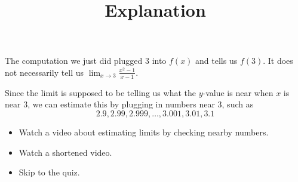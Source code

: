 \documentclass{ximera}
\title{Explanation}
\begin{document}
\begin{abstract}
\end{abstract}

\maketitle

The computation we just did plugged 3 into $f(x)$ and tells us $f(3)$. It does not necessarily tell us $\lim_{x \to 3} \frac{x^2-1}{x-1}$.

Since the limit is supposed to be telling us what the $y$-value is near when $x$ is near $3$, we can estimate this by plugging in numbers near $3$, such as
\[
    2.9, 2.99, 2.999, \ldots, 3.001, 3.01, 3.1
\]

\begin{itemize}
    \item {} Watch a video about estimating limits by checking nearby numbers.
    \item {} Watch a shortened video.
    \item {} Skip to the quiz.
\end{itemize}
\end{document}
